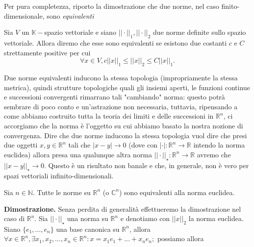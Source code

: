 Per pura completezza, riporto la dimostrazione che due norme, nel caso finito-dimensionale, sono \emph{equivalenti}
%
\vspace{0.5cm}
\begin{definition}[\textcolor{blue}{equivalenza fra norme}]
    Sia $V$ un $\mathbb{K}-$spazio vettoriale e siano $||\cdot||_1, ||\cdot||_2$ due norme definite sullo spazio vettoriale. Allora diremo che esse sono equivalenti se esistono due costanti $c$ e $C$ strettamente positive per cui
    \begin{equation}
        \forall x \in V, c||x||_1 \leq ||x||_2 \leq C||x||_1.
    \end{equation}
\end{definition}
%
\begin{remark}
    Due norme equivalenti inducono la stessa topologia (impropriamente la stessa metrica), quindi strutture topologiche quali gli insiemi aperti, le funzioni continue e successioni convergenti rimarrano tali "cambiando" norma: questo potrà sembrare di poco conto e un'astrazione non necessaria, tuttavia, ripensando a come abbiamo costruito tutta la teoria dei limiti e delle successioni in $\mathbb{R}^n$, ci accorgiamo che la norma è l'oggetto su cui abbiamo basato la nostra nozione di convergenza. Dire che
    due norme inducono la stessa topologia vuol dire che presi due oggetti $x, y \in \mathbb{R}^n$ tali che $|x - y| \to 0$ (dove con $|\cdot|: \mathbb{R}^n \to \mathbb{R}$ intendo la norma euclidea) allora presa una qualunque altra norma $||\cdot||_{\star}: \mathbb{R}^n \to \mathbb{R}$ avremo che $||x - y||_{\star} \to 0$. 
    Questo è un risultato non banale e che, in generale, non è vero per spazi vettoriali infinito-dimensionali.
\end{remark}
%
\vspace{0.5cm}
\begin{prop}
    Sia $n \in \mathbb{N}$. Tutte le norme su $\mathbb{R}^n$ (o $\mathbb{C}^n$) sono equivalenti alla norma euclidea.
    \label{thm:equiv_norme_euclidea}
\end{prop}
%
\noindent \textbf{Dimostrazione. }
    Senza perdita di generalità effettueremo la dimostrazione nel caso di $\mathbb{R}^n$. Sia $|| \cdot ||_{\star}$ una norma su $\mathbb{R}^n$ e denotiamo con $||x||_2$ la norma euclidea. Siano $\{e_1, \ldots, e_n \}$ una base canonica su $\mathbb{R}^n$, allora $\forall x \in \mathbb{R}^n, \exists x_1, x_2, \ldots, x_n \in \mathbb{R}^n : x = x_1 e_1 + \ldots + x_n e_n;$ possiamo allora
